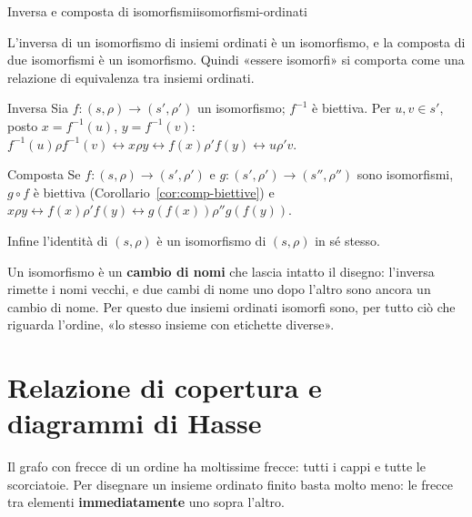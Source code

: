 \begin{concetto}
\begin{Proposizione}{Inversa e composta di isomorfismi}{isomorfismi-ordinati}
    \begin{prerequisiti}
    \end{prerequisiti}
    L'inversa di un isomorfismo di insiemi ordinati è un isomorfismo, e la composta di due isomorfismi è un isomorfismo.
    Quindi «essere isomorfi» si comporta come una relazione di equivalenza tra insiemi ordinati.
\end{Proposizione}
\begin{dimostrazione}
    \begin{caso}{Inversa}
        Sia $f \colon (s, \rho) \to (s', \rho')$ un isomorfismo; $f^{-1}$ è biettiva. Per $u, v \in s'$, posto $x = f^{-1}(u)$, $y = f^{-1}(v)$:
        $f^{-1}(u) \rho f^{-1}(v) \leftrightarrow x \rho y \leftrightarrow f(x) \rho' f(y) \leftrightarrow u \rho' v$.
    \end{caso}
    \begin{caso}{Composta}
        Se $f \colon (s, \rho) \to (s', \rho')$ e $g \colon (s', \rho') \to (s'', \rho'')$ sono isomorfismi, $g \circ f$ è biettiva
        (Corollario~\ref{cor:comp-biettive}) e $x \rho y \leftrightarrow f(x) \rho' f(y) \leftrightarrow g(f(x)) \rho'' g(f(y))$.
    \end{caso}
    Infine l'identità di $(s, \rho)$ è un isomorfismo di $(s, \rho)$ in sé stesso.
\end{dimostrazione}
\end{concetto}

\begin{spiegazione}
    Un isomorfismo è un \textbf{cambio di nomi} che lascia intatto il disegno: l'inversa rimette i nomi vecchi, e due cambi di nome
    uno dopo l'altro sono ancora un cambio di nome. Per questo due insiemi ordinati isomorfi sono, per tutto ciò che riguarda
    l'ordine, «lo stesso insieme con etichette diverse».
\end{spiegazione}

\section{Relazione di copertura e diagrammi di Hasse}\label{sec:hasse}

Il grafo con frecce di un ordine ha moltissime frecce: tutti i cappi e tutte le scorciatoie. Per disegnare un insieme ordinato
finito basta molto meno: le frecce tra elementi \textbf{immediatamente} uno sopra l'altro.

